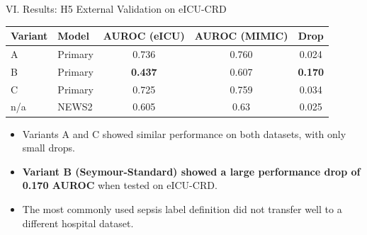 \begin{frame}{VI. Results: H5 External Validation on
              eICU-CRD~\cite{pollard2018eicu}}
\begin{center}\tablestyle
\begin{tabular}{llccc}
\toprule
\textbf{Variant} & \textbf{Model}
  & \textbf{AUROC (eICU)} & \textbf{AUROC (MIMIC)} & \textbf{Drop} \\
\midrule
A   & Primary & 0.736          & 0.760 & 0.024 \\
B   & Primary & \textbf{0.437} & 0.607 & \textbf{0.170} \\
C   & Primary & 0.725          & 0.759 & 0.034 \\
n/a & NEWS2   & 0.605          & 0.63  & 0.025 \\
\bottomrule
\end{tabular}
\end{center}

\vspace{6pt}
\begin{itemize}
  \item Variants A and C showed similar performance on both datasets, with
        only small drops.
  \item \textbf{Variant B (Seymour-Standard) showed a large performance drop
        of 0.170 AUROC} when tested on eICU-CRD.
  \item The most commonly used sepsis label definition did not transfer well
        to a different hospital dataset.
\end{itemize}
\end{frame}


